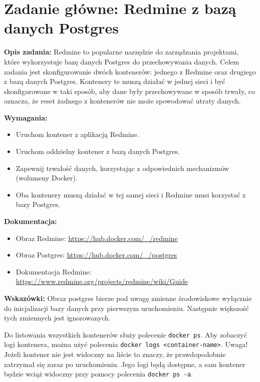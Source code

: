 \documentclass{article}
\begin{document}
\section{Zadanie główne: Redmine z bazą danych Postgres}

\textbf{Opis zadania:}  
Redmine to popularne narzędzie do zarządzania projektami, które wykorzystuje bazę danych Postgres do przechowywania danych. Celem zadania jest skonfigurowanie dwóch kontenerów: jednego z Redmine oraz drugiego z bazą danych Postgres. Kontenery te muszą działać w jednej sieci i być skonfigurowane w taki sposób, aby dane były przechowywane w sposób trwały, co oznacza, że reset żadnego z kontenerów nie może spowodować utraty danych.

\textbf{Wymagania:}
\begin{itemize}
    \item Uruchom kontener z aplikacją Redmine.
    \item Uruchom oddzielny kontener z bazą danych Postgres.
    \item Zapewnij trwałość danych, korzystając z odpowiednich mechanizmów (wolumeny Docker).
    \item Oba kontenery muszą działać w tej samej sieci i Redmine musi korzystać z bazy Postgres.
\end{itemize}

\textbf{Dokumentacja:}
\begin{itemize}
    \item Obraz Redmine: \url{https://hub.docker.com/_/redmine}
    \item Obraz Postgres: \url{https://hub.docker.com/_/postgres}
    \item Dokumentacja Redmine: \url{https://www.redmine.org/projects/redmine/wiki/Guide}
\end{itemize}

\textbf{Wskazówki:}
Obraz postgres bierze pod uwagę zmienne środowiskowe wyłącznie do inicjalizacji bazy danych przy pierwszym uruchomieniu. Następnie większość tych zmiennych jest ignorowanych. 

Do listowania wszystkich kontenerów służy polecenie \texttt{docker ps}. Aby zobaczyć logi kontenera, można użyć polecenia \texttt{docker logs <container-name>}. Uwaga! Jeżeli kontener nie jest widoczny na liście to znaczy, że prawdopodobnie zatrzymał się zaraz po uruchomieniu. Jego logi będą dostępne, a sam kontener będzie wciąż widoczny przy pomocy polecenia \texttt{docker ps -a}.
\end{document}
